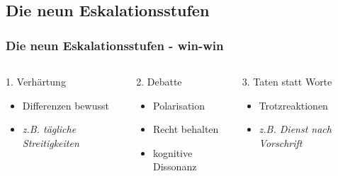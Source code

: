 \documentclass[
	ngerman,
	xcolor=dvipsnames,
	11pt
	]{beamer}
\begin{document}
\subsection{Die neun Eskalationsstufen}
\begin{frame}
	\frametitle{Die neun Eskalationsstufen - win-win}
\begin{columns}[t]
	\begin{column}{0.33\textwidth}
		\begin{block}{1. Verhärtung}
			\begin{itemize}
				\item Differenzen bewusst
				\item \it z.B. tägliche Streitigkeiten
			\end{itemize}
		\end{block}
	\end{column}
	\pause
	\begin{column}{0.33\textwidth}
		\begin{block}{2. Debatte}
			\begin{itemize}
				\item Polarisation
				\item Recht behalten
				\item kognitive Dissonanz
			\end{itemize}
		\end{block}
	\end{column}
	\pause
	\begin{column}{0.33\textwidth}
		\begin{block}{3. Taten statt Worte}
			\begin{itemize}
				\item Trotzreaktionen
				\item \it z.B. Dienst nach Vorschrift
			\end{itemize}
		\end{block}
	\end{column}
\end{columns}
\end{frame}
\end{document}

